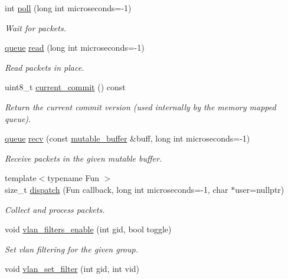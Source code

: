 \begin{DoxyCompactItemize}
int \hyperlink{classpfq_1_1socket_ad8ce551ea07f39317bb383ab88d66344}{poll} (long int microseconds=-\/1)
\begin{DoxyCompactList}\small\item\em Wait for packets. \end{DoxyCompactList}\item 
\hyperlink{classpfq_1_1queue}{queue} \hyperlink{classpfq_1_1socket_a6a79c81d3c366e49b8d64eb828ae5540}{read} (long int microseconds=-\/1)
\begin{DoxyCompactList}\small\item\em Read packets in place. \end{DoxyCompactList}\item 
uint8\+\_\+t \hyperlink{classpfq_1_1socket_aba44de6422e3e10b65474e7f3999ebd0}{current\+\_\+commit} () const 
\begin{DoxyCompactList}\small\item\em Return the current commit version (used internally by the memory mapped queue). \end{DoxyCompactList}\item 
\hyperlink{classpfq_1_1queue}{queue} \hyperlink{classpfq_1_1socket_ace69fbf64216b7b30a8a305a9d25229b}{recv} (const \hyperlink{namespacepfq_ad7b88920eaf729154354741132483ea8}{mutable\+\_\+buffer} \&buff, long int microseconds=-\/1)
\begin{DoxyCompactList}\small\item\em Receive packets in the given mutable buffer. \end{DoxyCompactList}\item 
{\footnotesize template$<$typename Fun $>$ }\\size\+\_\+t \hyperlink{classpfq_1_1socket_ae6cd08be2e7c35a548a64fded4359612}{dispatch} (Fun callback, long int microseconds=-\/1, char $\ast$user=nullptr)
\begin{DoxyCompactList}\small\item\em Collect and process packets. \end{DoxyCompactList}\item 
void \hyperlink{classpfq_1_1socket_aaf91b2e089edb2c4695584b01774326e}{vlan\+\_\+filters\+\_\+enable} (int gid, bool toggle)
\begin{DoxyCompactList}\small\item\em Set vlan filtering for the given group. \end{DoxyCompactList}\item 
void \hyperlink{classpfq_1_1socket_a92eeaf78ff595546c517b5699c9a5b1e}{vlan\+\_\+set\+\_\+filter} (int gid, int vid)

\end{DoxyCompactItemize}
